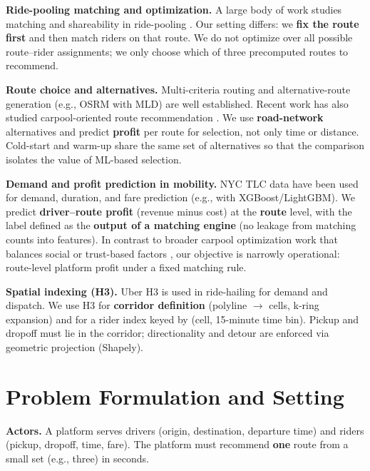\documentclass[11pt,a4paper]{article}
\begin{document}
\textbf{Ride-pooling matching and optimization.} A large body of work studies matching and shareability in ride-pooling \cite{alonso-mora,agatz-atlanta,agatz-review,stiglic,chen-mcts}. Our setting differs: we \textbf{fix the route first} and then match riders on that route. We do not optimize over all possible route--rider assignments; we only choose which of three precomputed routes to recommend.

\textbf{Route choice and alternatives.} Multi-criteria routing and alternative-route generation (e.g., OSRM with MLD) are well established. Recent work has also studied carpool-oriented route recommendation \cite{bassem-route}. We use \textbf{road-network} alternatives and predict \textbf{profit} per route for selection, not only time or distance. Cold-start and warm-up share the same set of alternatives so that the comparison isolates the value of ML-based selection.

\textbf{Demand and profit prediction in mobility.} NYC TLC data have been used for demand, duration, and fare prediction (e.g., with XGBoost/LightGBM). We predict \textbf{driver--route profit} (revenue minus cost) at the \textbf{route} level, with the label defined as the \textbf{output of a matching engine} (no leakage from matching counts into features). In contrast to broader carpool optimization work that balances social or trust-based factors \cite{graal,srnc}, our objective is narrowly operational: route-level platform profit under a fixed matching rule.

\textbf{Spatial indexing (H3).} Uber H3 is used in ride-hailing for demand and dispatch. We use H3 for \textbf{corridor definition} (polyline $\to$ cells, k-ring expansion) and for a rider index keyed by (cell, 15-minute time bin). Pickup and dropoff must lie in the corridor; directionality and detour are enforced via geometric projection (Shapely).

\section{Problem Formulation and Setting}
\label{sec:problem}

\textbf{Actors.} A platform serves drivers (origin, destination, departure time) and riders (pickup, dropoff, time, fare). The platform must recommend \textbf{one} route from a small set (e.g., three) in seconds.
\end{document}

